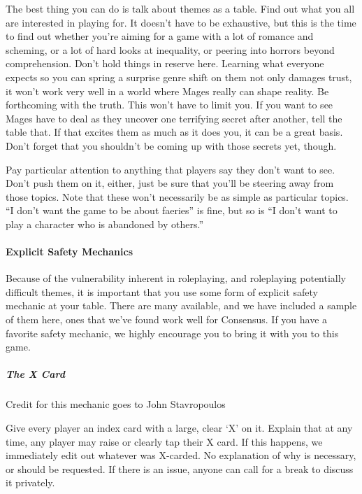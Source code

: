 \documentclass[
]{article}
\begin{document}
The best thing you can do is talk about themes as a table. Find out what
you all are interested in playing for. It doesn't have to be exhaustive,
but this is the time to find out whether you're aiming for a game with a
lot of romance and scheming, or a lot of hard looks at inequality, or
peering into horrors beyond comprehension. Don't hold things in reserve
here. Learning what everyone expects so you can spring a surprise genre
shift on them not only damages trust, it won't work very well in a world
where Mages really can shape reality. Be forthcoming with the truth.
This won't have to limit you. If you want to see Mages have to deal as
they uncover one terrifying secret after another, tell the table that.
If that excites them as much as it does you, it can be a great basis.
Don't forget that you shouldn't be coming up with those secrets yet,
though.

Pay particular attention to anything that players say they don't want to
see. Don't push them on it, either, just be sure that you'll be steering
away from those topics. Note that these won't necessarily be as simple
as particular topics. ``I don't want the game to be about faeries'' is
fine, but so is ``I don't want to play a character who is abandoned by
others.''

\hypertarget{explicit-safety-mechanics}{%
\paragraph{Explicit Safety Mechanics}\label{explicit-safety-mechanics}}

Because of the vulnerability inherent in roleplaying, and roleplaying
potentially difficult themes, it is important that you use some form of
explicit safety mechanic at your table. There are many available, and we
have included a sample of them here, ones that we've found work well for
Consensus. If you have a favorite safety mechanic, we highly encourage
you to bring it with you to this game.

\hypertarget{the-x-card}{%
\subparagraph{The X Card}\label{the-x-card}}

Credit for this mechanic goes to John Stavropoulos

Give every player an index card with a large, clear `X' on it. Explain
that at any time, any player may raise or clearly tap their X card. If
this happens, we immediately edit out whatever was X-carded. No
explanation of why is necessary, or should be requested. If there is an
issue, anyone can call for a break to discuss it privately.
\end{document}
